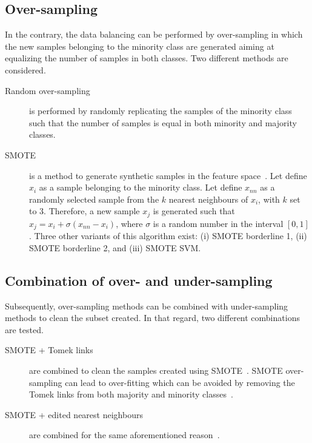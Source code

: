 \documentclass[twoside,11pt]{article}
\begin{document}
\subsection{Over-sampling}

In the contrary, the data balancing can be performed by over-sampling in which the new samples belonging to the minority class are generated aiming at equalizing the number of samples in both classes.
Two different methods are considered.
\begin{description}
\item[Random over-sampling] is performed by randomly replicating the samples of the minority class such that the number of samples is equal in both minority and majority classes.
\end{description}
\begin{description}
\item[SMOTE] is a method to generate synthetic samples in the feature space~\cite{chawla2002smote}.
Let define $x_i$ as a sample belonging to the minority class.
Let define $x_{nn}$ as a randomly selected sample from the $k$ nearest neighbours of $x_i$, with $k$ set to 3.
Therefore, a new sample $x_j$ is generated such that $x_j = x_i + \sigma \left( x_{nn} - x_i \right)$, where $\sigma$ is a random number in the interval $\left[0,1\right]$.
Three other variants of this algorithm exist: (i) SMOTE borderline 1, (ii) SMOTE borderline 2, and (iii) SMOTE SVM.
\end{description}

\subsection{Combination of over- and under-sampling}

Subsequently, over-sampling methods can be combined with under-sampling methods to clean the subset created.
In that regard, two different combinations are tested.

\begin{description}
  \item[SMOTE + Tomek links] are combined to clean the samples created using SMOTE~\cite{batista2003balancing}.
SMOTE over-sampling can lead to over-fitting which can be avoided by removing the Tomek links from both majority and minority classes~\cite{prati2009data}.
  \item[SMOTE + edited nearest neighbours] are combined for the same aforementioned reason~\cite{batista2004study}.
\end{description}
\end{document}
